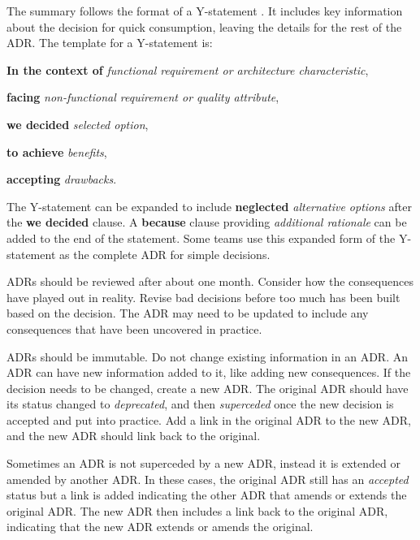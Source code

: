 The summary follows the format of a Y-statement \cite{y-statement}.
It includes key information about the decision for quick consumption, leaving the details for the rest of the ADR.
The template for a Y-statement is:

\textbf{In the context of} \emph{functional requirement or architecture characteristic},

\textbf{facing} \emph{non-functional requirement or quality attribute},

\textbf{we decided} \emph{selected option},

\textbf{to achieve} \emph{benefits},

\textbf{accepting} \emph{drawbacks}.

\noindent
The Y-statement can be expanded to include \textbf{neglected} \emph{alternative options} after the \textbf{we decided} clause.
A \textbf{because} clause providing \emph{additional rationale} can be added to the end of the statement.
Some teams use this expanded form of the Y-statement as the complete ADR for simple decisions.

ADRs should be reviewed after about one month.
Consider how the consequences have played out in reality.
Revise bad decisions before too much has been built based on the decision.
The ADR may need to be updated to include any consequences that have been uncovered in practice.

ADRs should be immutable. Do not change existing information in an ADR.
An ADR can have new information added to it, like adding new consequences.
If the decision needs to be changed, create a new ADR.
The original ADR should have its status changed to \emph{deprecated},
and then \emph{superceded} once the new decision is accepted and put into practice.
Add a link in the original ADR to the new ADR, and the new ADR should link back to the original.

Sometimes an ADR is not superceded by a new ADR, instead it is extended or amended by another ADR.
In these cases, the original ADR still has an \emph{accepted} status but
a link is added indicating the other ADR that amends or extends the original ADR.
The new ADR then includes a link back to the original ADR, indicating that the new ADR extends or amends the original.

\filbreak
